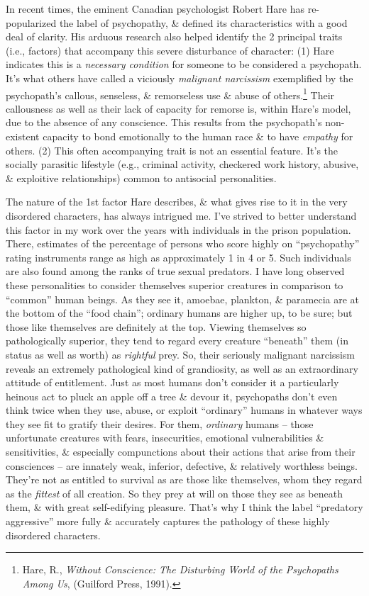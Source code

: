 \documentclass{article}
\numberwithin{equation}{section}
\begin{document}
In recent times, the eminent Canadian psychologist Robert Hare has re-popularized the label of psychopathy, \& defined its characteristics with a good deal of clarity. His arduous research also helped identify the 2 principal traits (i.e., factors) that accompany this severe disturbance of character: (1) Hare indicates this is a \textit{necessary condition} for someone to be considered a psychopath. It's what others have called a viciously \textit{malignant narcissism} exemplified by the psychopath's callous, senseless, \& remorseless use \& abuse of others.\footnote{Hare, R., \textit{Without Conscience: The Disturbing World of the Psychopaths Among Us}, (Guilford Press, 1991).} Their callousness as well as their lack of capacity for remorse is, within Hare's model, due to the absence of any conscience. This results from the psychopath's non-existent capacity to bond emotionally to the human race \& to have \textit{empathy} for others. (2) This often accompanying trait is not an essential feature. It's the socially parasitic lifestyle (e.g., criminal activity, checkered work history, abusive, \& exploitive relationships) common to antisocial personalities.

The nature of the 1st factor Hare describes, \& what gives rise to it in the very disordered characters, has always intrigued me. I've strived to better understand this factor in my work over the years with individuals in the prison population. There, estimates of the percentage of persons who score highly on ``psychopathy'' rating instruments range as high as approximately 1 in 4 or 5. Such individuals are also found among the ranks of true sexual predators. I have long observed these personalities to consider themselves superior creatures in comparison to ``common'' human beings. As they see it, amoebae, plankton, \& paramecia are at the bottom of the ``food chain''; ordinary humans are higher up, to be sure; but those like themselves are definitely at the top. Viewing themselves so pathologically superior, they tend to regard every creature ``beneath'' them (in status as well as worth) as \textit{rightful} prey. So, their seriously malignant narcissism reveals an extremely pathological kind of grandiosity, as well as an extraordinary attitude of entitlement. Just as most humans don't consider it a particularly heinous act to pluck an apple off a tree \& devour it, psychopaths don't even think twice when they use, abuse, or exploit ``ordinary'' humans in whatever ways they see fit to gratify their desires. For them, \textit{ordinary} humans -- those unfortunate creatures with fears, insecurities, emotional vulnerabilities \& sensitivities, \& especially compunctions about their actions that arise from their consciences -- are innately weak, inferior, defective, \& relatively worthless beings. They're not as entitled to survival as are those like themselves, whom they regard as the \textit{fittest} of all creation. So they prey at will on those they see as beneath them, \& with great self-edifying pleasure. That's why I think the label ``predatory aggressive'' more fully \& accurately captures the pathology of these highly disordered characters.
\end{document}
